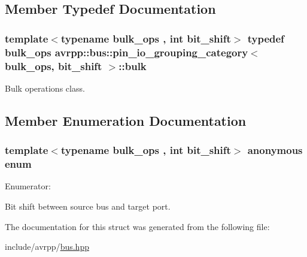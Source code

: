 \subsection{Member Typedef Documentation}
\hypertarget{structavrpp_1_1bus_1_1pin__io__grouping__category_ab2cd4db2f1bcdfea4ac706704e264e3d}{
\subsubsection[{bulk}]{\setlength{\rightskip}{0pt plus 5cm}template$<$typename bulk\_\-ops , int bit\_\-shift$>$ typedef bulk\_\-ops {\bf avrpp::bus::pin\_\-io\_\-grouping\_\-category}$<$ bulk\_\-ops, bit\_\-shift $>$::{\bf bulk}}}
\label{structavrpp_1_1bus_1_1pin__io__grouping__category_ab2cd4db2f1bcdfea4ac706704e264e3d}


Bulk operations class. 



\subsection{Member Enumeration Documentation}
\hypertarget{structavrpp_1_1bus_1_1pin__io__grouping__category_af29145823ae396f458045a03f6a8a990}{
\subsubsection[{"@0}]{\setlength{\rightskip}{0pt plus 5cm}template$<$typename bulk\_\-ops , int bit\_\-shift$>$ anonymous enum}}
\label{structavrpp_1_1bus_1_1pin__io__grouping__category_af29145823ae396f458045a03f6a8a990}
\begin{Desc}
\item[Enumerator: ]\par
\begin{description}
\item[{\em 
\hypertarget{structavrpp_1_1bus_1_1pin__io__grouping__category_af29145823ae396f458045a03f6a8a990a880849596426606916d1b706e0969ccd}{
shift}
\label{structavrpp_1_1bus_1_1pin__io__grouping__category_af29145823ae396f458045a03f6a8a990a880849596426606916d1b706e0969ccd}
}]Bit shift between source bus and target port. \end{description}
\end{Desc}



The documentation for this struct was generated from the following file:\begin{DoxyCompactItemize}
\item 
include/avrpp/\hyperlink{bus_8hpp}{bus.hpp}\end{DoxyCompactItemize}
